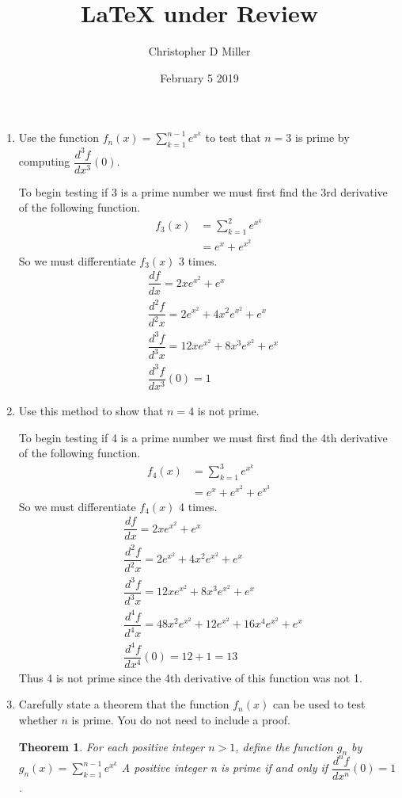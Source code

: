 \documentclass[12pt]{article}
\title{LaTeX under Review}
\author{Christopher D Miller}
\date{February 5 2019}
\theoremstyle{plain}
\newtheorem{theorem}{Theorem}
\begin{document}
\maketitle

\begin{enumerate}
\item Use the function \( \displaystyle{f_n(x) = \sum_{k=1}^{n-1} e^{x^k}} \) to test that $n=3$ is prime by computing 
\( \dfrac{d^3 f}{dx^3}(0) \).

To begin testing if 3 is a prime number we must first find the 3rd derivative of the following function.
    \begin{align*}
            f_3(x) &= \sum_{k=1}^{2}e^{x^k}\\
            &= e^x + e^{x^2} 
    \end{align*}
So we must differentiate $f_3(x)$ 3 times.
    \begin{align*}
        &\dfrac{d f}{dx} = 2 x e^{x^2}+e^x\\
        &\dfrac{d^2 f}{d^2x} =  2 e^{x^2}+4 x^2 e^{x^2}+e^x\\
        &\dfrac{d^3 f}{d^3x} = 12 x e^{x^2} +8 x^3 e^{x^2} 
        +e^x \\
        &\dfrac{d^3 f}{dx^3}(0) = 1
    \end{align*}


\item Use this method to show that $n=4$ is not prime.

To begin testing if 4 is a prime number we must first find the 4th derivative of the following function.
\begin{align*}
        f_4(x) &= \sum_{k=1}^{3}e^{x^k}\\
        &= e^x + e^{x^2} + e^{x^3} 
\end{align*}
So we must differentiate $f_4(x)$ 4 times.
\begin{align*}
    &\dfrac{d f}{dx} = 2 x e^{x^2} +e^x \\
    &\dfrac{d^2 f}{d^2x} =  2 e^{x^2}+4 x^2 e^{x^2}+e^x\\
    &\dfrac{d^3 f}{d^3x} = 12 x e^{x^2} +8 x^3 e^{x^2} 
    +e^x \\
    &\dfrac{d^4 f}{d^4x} = 48 x^2 e^{x^2} +12 e^{x^2} +16 x^4 e^{x^2} +e^x  \\
    &\dfrac{d^4 f}{dx^4}(0) = 12  + 1 =13
\end{align*}
Thus 4 is not prime since the 4th derivative of this function was not 1.

\item Carefully state a theorem that the function $f_n(x)$ can be used to test whether $n$ is prime.   You do not need to include a proof.
\begin{theorem}
    For each positive integer $n > 1$, define the function $g_n$ by $g_n(x) = \sum_{k=1}^{n-1}e^{x^k}$ A positive integer n is prime if and only if $\dfrac{d^n f}{dx^n}(0) =1$.
\end{theorem}

\end{enumerate}
\end{document}
